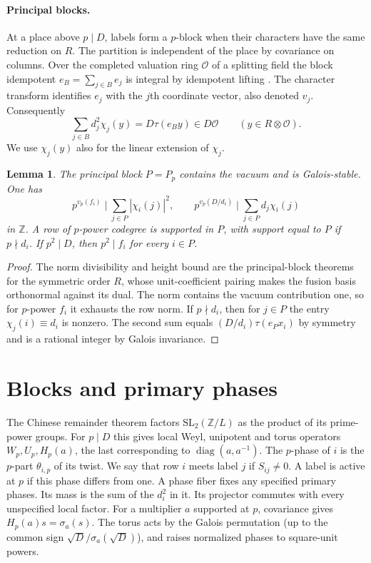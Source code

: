 \documentclass[11pt]{amsart}
\numberwithin{equation}{section}
\newtheorem{lemma}[theorem]{Lemma}
\theoremstyle{definition}
\theoremstyle{plain}
\newcommand{\ZZ}{\mathbb Z}
\begin{document}
\paragraph{Principal blocks.}
At a place above $p\mid D$, labels form a $p$-block when their
characters have the same reduction on $R$. The partition is independent
of the place by covariance on columns. Over the completed valuation
ring $\mathcal O$ of a splitting field the block idempotent
$e_B=\sum_{j\in B}e_j$ is integral by idempotent lifting
\cite[Tag 04GH]{Stacks}. The character transform identifies $e_j$ with the $j$th coordinate vector, also denoted $v_j$.
Consequently
\begin{equation}
 \sum_{j\in B} d_j^2\chi_j(y)=D\tau(e_By)\in D\mathcal O
 \qquad(y\in R\otimes\mathcal O).
\end{equation}
We use $\chi_j(y)$ also for the linear extension of $\chi_j$.

\begin{lemma}\label{block:height}
The principal block $P=P_p$ contains the vacuum and is Galois-stable.
One has
\begin{equation}\label{eq:principal-trace}
 p^{v_p(f_i)}\mid\sum_{j\in P}|\chi_i(j)|^2,\qquad
 p^{v_p(D/d_i)}\mid\sum_{j\in P}d_j\chi_i(j)
\end{equation}
in $\ZZ$. A row of $p$-power codegree is supported in $P$, with
support equal to $P$ if $p\nmid d_i$. If $p^2\mid D$, then
$p^2\mid f_i$ for every $i\in P$.
\end{lemma}
\begin{proof}
The norm divisibility and height bound are the principal-block
theorems \cite[Theorem~2.11 and Corollary~4.1]{BDPcore} for the
symmetric order $R$, whose unit-coefficient pairing makes the fusion
basis orthonormal against its dual. The norm contains the vacuum
contribution one, so for $p$-power $f_i$ it exhausts the row norm.
If $p\nmid d_i$, then for $j\in P$ the entry $\chi_j(i)\equiv d_i$
is nonzero. The second sum equals $(D/d_i)\tau(e_Px_i)$ by symmetry
and is a rational integer by Galois invariance.
\end{proof}

\section{Blocks and primary phases}
The Chinese remainder theorem factors $\mathrm{SL}_2(\ZZ/L)$ as the product of its prime-power groups. For $p\mid D$ this gives local Weyl, unipotent
and torus operators $W_p,U_p,H_p(a)$, the last corresponding to
$\operatorname{diag}(a,a^{-1})$. The $p$-phase of $i$ is the
$p$-part $\theta_{i,p}$ of its twist. We say that row $i$ meets label $j$ if $S_{ij}\ne0$. A label is active at $p$ if
this phase differs from one. A phase fiber fixes any specified
primary phases. Its mass is the sum of the $d_i^2$ in it. Its
projector commutes with every unspecified local factor.
For a multiplier $a$ supported at $p$, covariance gives
$H_p(a)s=\sigma_a(s)$. The torus acts by the Galois permutation
(up to the common sign $\sqrt D/\sigma_a(\sqrt D)$), and raises
normalized phases to square-unit powers.
\end{document}
